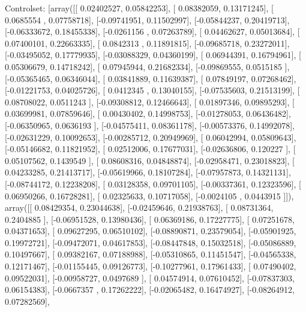 \documentclass{article}
\begin{document}
Controlset: [array([[ 0.02402527,  0.05842253],
       [ 0.08382059,  0.13171245],
       [ 0.0685554 ,  0.07758718],
       [-0.09741951,  0.11502997],
       [-0.05844237,  0.20419713],
       [-0.06333672,  0.18455338],
       [-0.0261156 ,  0.07263789],
       [ 0.04462627,  0.05013684],
       [ 0.07400101,  0.22663335],
       [ 0.0842313 ,  0.11891815],
       [-0.09685718,  0.23272011],
       [-0.03495052,  0.17779935],
       [-0.03088329,  0.04360199],
       [ 0.06944391,  0.16794961],
       [ 0.05306679,  0.14718242],
       [ 0.07945944,  0.21682334],
       [-0.09869555,  0.0515185 ],
       [-0.05365465,  0.06346044],
       [ 0.03841889,  0.11639387],
       [ 0.07849197,  0.07268462],
       [-0.01221753,  0.04025726],
       [ 0.0412345 ,  0.13040155],
       [-0.07535603,  0.21513199],
       [ 0.08708022,  0.0511243 ],
       [-0.09308812,  0.12466643],
       [ 0.01897346,  0.09895293],
       [ 0.03699981,  0.07859646],
       [ 0.00430402,  0.14998753],
       [-0.01278053,  0.06436482],
       [-0.06350965,  0.0636193 ],
       [-0.04575411,  0.08361178],
       [-0.00573376,  0.14992078],
       [-0.02631229,  0.10092653],
       [-0.00285712,  0.20949969],
       [ 0.06042994,  0.05809643],
       [-0.05146682,  0.11821952],
       [ 0.02512006,  0.17677031],
       [-0.02636806,  0.120227  ],
       [ 0.05107562,  0.1439549 ],
       [ 0.08608316,  0.04848874],
       [-0.02958471,  0.23018823],
       [ 0.04233285,  0.21413717],
       [-0.05619966,  0.18107284],
       [-0.07957873,  0.14321131],
       [-0.08744172,  0.12238208],
       [ 0.03128358,  0.09701105],
       [-0.00337361,  0.12323596],
       [ 0.06950266,  0.16728281],
       [ 0.02325633,  0.10717058],
       [-0.0024105 ,  0.0443915 ]]), array([[ 0.08429354,  0.23044638],
       [-0.02459646,  0.21938763],
       [ 0.08731364,  0.2404885 ],
       [-0.06951528,  0.13980436],
       [ 0.06369186,  0.17227775],
       [ 0.07251678,  0.04371653],
       [ 0.09627295,  0.06510102],
       [-0.08890871,  0.23579054],
       [-0.05901925,  0.19972721],
       [-0.09472071,  0.04617853],
       [-0.08447848,  0.15032518],
       [-0.05086889,  0.10497667],
       [ 0.09382167,  0.07188988],
       [-0.05310865,  0.11451547],
       [-0.04565338,  0.12171467],
       [-0.01155445,  0.09126773],
       [-0.10277961,  0.17961433],
       [ 0.07490402,  0.09522031],
       [-0.00958727,  0.0497689 ],
       [ 0.04574914,  0.07610452],
       [-0.07837303,  0.06154383],
       [-0.0667357 ,  0.17262222],
       [-0.02065482,  0.16474927],
       [-0.08264912,  0.07282569],
\end{document}
